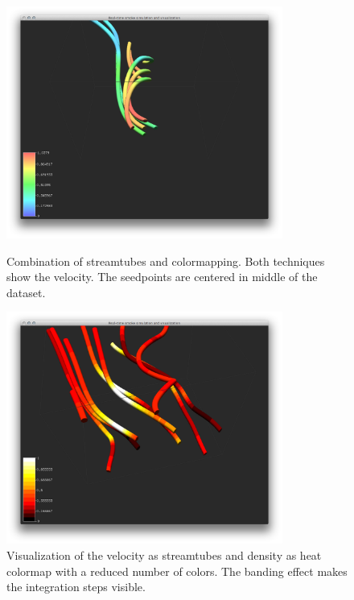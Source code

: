 \begin{figure}[htbp]
\centering
\begin{minipage}[t]{0.48\textwidth}
        \includegraphics[height=3in]{figures/streamtubes/10tubes.png}
\caption{Combination of streamtubes and colormapping. Both techniques show the velocity. The seedpoints are centered in middle of the dataset.}
\label{fig:}
\end{minipage}\hspace{.04\textwidth}%
\begin{minipage}[t]{0.48\textwidth}
    \includegraphics[height=3in]{figures/streamtubes/21banding_velodensity.png}
    \caption{Visualization of the velocity as streamtubes and density as heat colormap with a reduced number of colors. The banding effect makes the integration steps visible.}
    \label{fig:}
\end{minipage}
\end{figure}    

